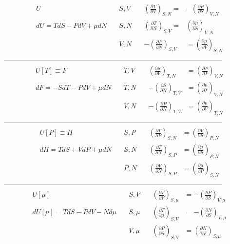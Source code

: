 \begin{align}
	&U \quad &S, V \quad & \left( \frac{\partial T}{\partial V} \right)_{S, N} =& -\left( \frac{\partial P}{\partial S} \right)_{V, N} \label{equ7.3} \\
	&dU = TdS - PdV + \mu dN \quad & S, N \quad & \left( \frac{\partial T}{\partial N} \right)_{S, V} =& \left( \frac{\partial \mu}{\partial S} \right)_{V, N} \label{equ7.4} \\
	&\phantom{dU = TdS - PdV + \mu dN \quad} & V, N \quad & -\left( \frac{\partial P}{\partial N} \right)_{S, V} &= \left( \frac{\partial \mu}{\partial V} \right)_{S, N} \label{equ7.5}
\end{align}
————————————————————————————————
\begin{align}
	&U[T]\equiv F & T, V \quad & \left(\frac{\partial S}{\partial V} \right)_{T, N} &= \left( \frac{\partial P}{\partial T} \right)_{V, N} \label{equ7.6} \\
	&dF = -SdT - PdV + \mu dN \quad & T, N \quad & -\left(\frac{\partial S}{\partial N}\right)_{T, V} &= \left(\frac{\partial \mu}{\partial T} \right)_{V, N} \label{equ7.7} \\
	&\phantom{dF = -SdT - PdV + \mu dN \quad} & V, N \quad & -\left( \frac{\partial P}{\partial N} \right)_{T, V} &= \left( \frac{\partial \mu}{\partial V} \right)_{T, N} \label{equ7.8}
\end{align}
————————————————————————————————
\begin{align}
	& U[P] \equiv H \quad & S, P \quad & \left( \frac{\partial T}{\partial P} \right)_{S, N} &= \left( \frac{\partial V}{\partial S} \right)_{P, N} \label{equ7.9} \\
	&dH = TdS + VdP + \mu dN \quad & S, N \quad & \left( \frac{\partial T}{\partial N} \right)_{S, P} &= \left( \frac{\partial \mu}{\partial S} \right)_{P, N} \label{equ7.10} \\
	&\phantom{dH = TdS + VdP + \mu dN \quad} & P, N \quad & \left(\frac{\partial V}{\partial N} \right)_{S, P} &= \left( \frac{\partial \mu}{\partial P} \right)_{S, N} \label{equ7.11} 
\end{align}
————————————————————————————————
\begin{align}
	& U[\mu] \quad & S, V \quad & \left(\frac{\partial T}{\partial V} \right)_{S, \mu} &= -\left( \frac{\partial P}{\partial S} \right)_{V, \mu} \label{equ7.12} \\
	& dU[\mu] = TdS - PdV - Nd\mu \quad & S, \mu \quad & \left(\frac{\partial T}{\partial \mu} \right)_{S, V} &= -\left( \frac{\partial N}{\partial S} \right)_{V, \mu} \label{equ7.13} \\
	& \phantom{dU[\mu] = TdS - PdV - Nd\mu \quad} & V, \mu \quad & \left(\frac{\partial P}{\partial \mu} \right)_{S, V} &= \left( \frac{\partial N}{\partial V} \right)_{S, \mu} \label{equ7.14}
\end{align}
